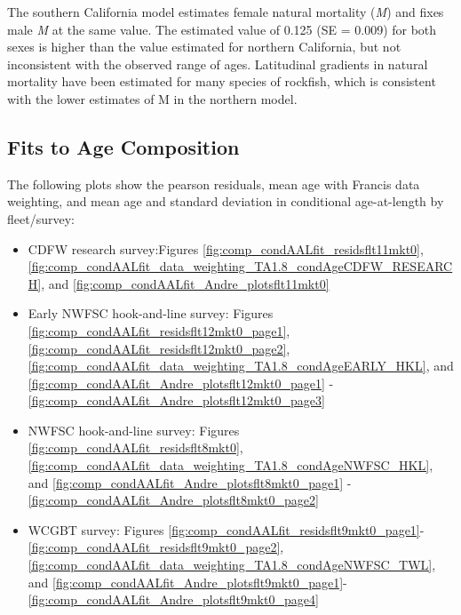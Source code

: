 \documentclass[11pt,
  english,
  a4paper,
]{article}
\begin{document}
The southern California model estimates female natural mortality (\emph{M}) and fixes male \emph{M} at the same value. The estimated value of 0.125 (SE = 0.009) for both sexes is higher than the value estimated for northern California, but not inconsistent with the observed range of ages. Latitudinal gradients in natural mortality have been estimated for many species of rockfish, which is consistent with the lower estimates of M in the northern model.


\hypertarget{fits-to-age-composition}{%
\subsection{Fits to Age Composition}\label{fits-to-age-composition}}

\leavevmode\tagmcend\tagstructend

The following plots show the pearson residuals, mean age with Francis data weighting, and mean age and standard deviation in conditional age-at-length by fleet/survey:


\begin{itemize}
\item
  CDFW research survey:Figures \ref{fig:comp_condAALfit_residsflt11mkt0}, \ref{fig:comp_condAALfit_data_weighting_TA1.8_condAgeCDFW_RESEARCH}, and \ref{fig:comp_condAALfit_Andre_plotsflt11mkt0}
\item
  Early NWFSC hook-and-line survey: Figures \ref{fig:comp_condAALfit_residsflt12mkt0_page1}, \ref{fig:comp_condAALfit_residsflt12mkt0_page2}, \ref{fig:comp_condAALfit_data_weighting_TA1.8_condAgeEARLY_HKL}, and \ref{fig:comp_condAALfit_Andre_plotsflt12mkt0_page1} - \ref{fig:comp_condAALfit_Andre_plotsflt12mkt0_page3}
\item
  NWFSC hook-and-line survey: Figures \ref{fig:comp_condAALfit_residsflt8mkt0}, \ref{fig:comp_condAALfit_data_weighting_TA1.8_condAgeNWFSC_HKL}, and \ref{fig:comp_condAALfit_Andre_plotsflt8mkt0_page1} - \ref{fig:comp_condAALfit_Andre_plotsflt8mkt0_page2}
\item
  WCGBT survey: Figures \ref{fig:comp_condAALfit_residsflt9mkt0_page1}- \ref{fig:comp_condAALfit_residsflt9mkt0_page2}, \ref{fig:comp_condAALfit_data_weighting_TA1.8_condAgeNWFSC_TWL}, and \ref{fig:comp_condAALfit_Andre_plotsflt9mkt0_page1}- \ref{fig:comp_condAALfit_Andre_plotsflt9mkt0_page4}
\end{itemize}
\end{document}

